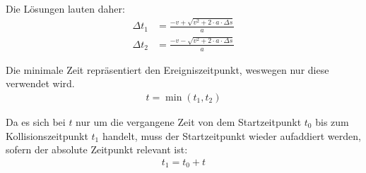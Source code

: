 Die Lösungen lauten daher:
\begin{align}
    \Delta t_1 &= \frac{-v + \sqrt{v^2 + 2 \cdot a \cdot \Delta s}}{a}\\
    \Delta t_2 &= \frac{-v - \sqrt{v^2 + 2 \cdot a \cdot \Delta s}}{a}
\end{align}

Die minimale Zeit repräsentiert den Ereigniszeitpunkt, weswegen nur diese verwendet wird.
\begin{align}
    t = \min(t_1, t_2)
\end{align}

Da es sich bei $t$ nur um die vergangene Zeit von dem Startzeitpunkt $t_0$ bis zum Kollisionszeitpunkt $t_1$ handelt,
muss der Startzeitpunkt wieder aufaddiert werden, sofern der absolute Zeitpunkt relevant ist:
\begin{align}
    t_1 = t_0 + t
\end{align}
